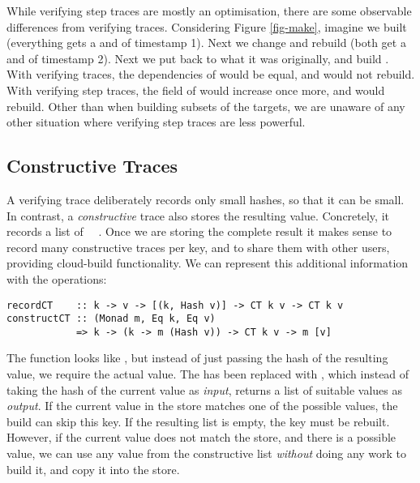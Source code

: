 While verifying step traces are mostly an optimisation, there are some observable differences from verifying traces. Considering Figure \ref{fig-make}, imagine we built  (everything gets a  and  of timestamp 1). Next we change  and rebuild  (both get a  and  of timestamp 2). Next we put  back to what it was originally, and build . With verifying traces, the dependencies of  would be equal, and  would not rebuild. With verifying step traces, the  field of  would increase once more, and  would rebuild. Other than when building subsets of the targets, we are unaware of any other situation where verifying step traces are less powerful.

\subsection{Constructive Traces}\label{sec-constructive-traces}

A verifying trace deliberately records only small hashes, so that it can be small.
In contrast, a \emph{constructive} trace also stores the resulting value. Concretely,
it records a list of ~~.
Once we are storing the complete result it makes sense
to record many constructive traces per key, and to share them with other users,
providing cloud-build functionality. We can represent this additional
information with the operations:

\begin{verbatim}
recordCT    :: k -> v -> [(k, Hash v)] -> CT k v -> CT k v
constructCT :: (Monad m, Eq k, Eq v)
            => k -> (k -> m (Hash v)) -> CT k v -> m [v]
\end{verbatim}

\noindent
The function  looks like , but instead of just passing
the hash of the resulting value, we require the actual value. The 
has been replaced with , which instead of taking the hash of the
current value as \emph{input}, returns a list of suitable values as \emph{output}.
If the current value in the store matches one of the possible values, the build
can skip this key. If the resulting list is empty, the key must be rebuilt.
However, if the current value does not match the store, and there is a possible
value, we can use any value from the constructive list \emph{without} doing any
work to build it, and copy it into the store.

